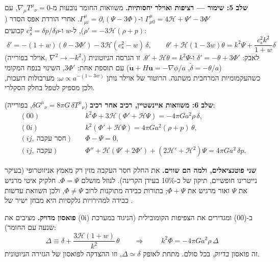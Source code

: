 \textbf{שלב 5: שימור --- רציפות ואוילר יחסותיות.} משוואות החומר נובעות מ-$\nabla_\mu T^\mu{}_\nu=0$, עם $\Gamma^\mu_{\mu0}=4\mathcal H+\Psi'-3\Phi'$ ו-$\Gamma^\mu_{\mu i}=\partial_i(\Psi-3\Phi)$. אחרי הורדת אפס הסדר ($\rho'=-3\mathcal H(\rho+p)$), ל-$w$ ו-$c_s^2=\delta p/\delta\rho$ קבועים:
\begin{equation}
\boxed{\;\delta'=-(1+w)(\theta-3\Phi')-3\mathcal H(c_s^2-w)\,\delta,\qquad
\theta'+\mathcal H(1-3w)\theta=k^2\Psi+\frac{c_s^2k^2}{1+w}\delta\;}
\label{eq:gr-fluid}
\end{equation}
(אוילר בפורייה, $\nabla^2\to-k^2$.) לאבק: $\delta'=-\theta+3\Phi'$ ו-$\theta'+\mathcal H\theta=k^2\Psi$. זו הגרסה הניוטונית ($\dot\delta=-\theta/a$, $\dot{\mathbf u}+H\mathbf u=-\nabla\phi/a$) עם תוספת אחת: $3\Phi'$, השינוי בנפח המקומי כשהעקמומיות המרחבית משתנה. הרוטור של אוילר נותן $\omega\propto a^{-(1-3w)}$: מערבולות דועכות, ולכן מספיק לטפל בחלק הסקלרי.

\textbf{שלב 6: משוואות איינשטיין, רכיב אחר רכיב} ($\delta G^\mu{}_\nu=8\pi G\,\delta T^\mu{}_\nu$, בפורייה):
\begin{align}
(00)\quad& k^2\Phi+3\mathcal H(\Phi'+\mathcal H\Psi)=-4\pi Ga^2\rho\,\delta, \label{eq:gr-00}\\
(0i)\quad& k^2(\Phi'+\mathcal H\Psi)=4\pi Ga^2(\rho+p)\,\theta, \label{eq:gr-0i}\\
(ij,\ \text{חסר עקבה})\quad& \Phi-\Psi=0, \label{eq:gr-slip}\\
(ij,\ \text{עקבה})\quad& \Phi''+\mathcal H(\Psi'+2\Phi')+(2\mathcal H'+\mathcal H^2)\Psi=4\pi Ga^2\,\delta p . \label{eq:gr-ii}
\end{align}

\begin{keybox}
\textbf{שני פוטנציאלים, ולמה הם שווים.} את החלק חסר העקבה מזין רק מאמץ אניזוטרופי (בעיקר נייטרינו חופשיים, תיקון של כ-10\% בעידן הקרינה). לנוזל מושלם $\Phi=\Psi$. חלקיק איטי מרגיש את $\Psi$ ואור מרגיש את $\Phi+\Psi$; בתורות כבידה מתוקנות לרוב $\Phi\ne\Psi$, ולכן השוואת עדשות כבידה למהירויות גלקסיות היא מבחן ישיר של .
\end{keybox}

\textbf{פואסון מדויק.} מציבים את (0i) ב-(00) ומגדירים את הצפיפות הקומובילית (הניגוד במערכת שנעה עם החומר):
\begin{equation}
\Delta\equiv\delta+\frac{3\mathcal H(1+w)}{k^2}\,\theta\qquad\Longrightarrow\qquad
\boxed{\;k^2\Phi=-4\pi Ga^2\rho\,\Delta\;}
\label{eq:gr-poisson}
\end{equation}
זה פואסון \emph{בדיוק}, בכל סולם. מתחת לאופק $\Delta\simeq\delta$, וזו ההצדקה לפואסון של הגזירה הניוטונית.

